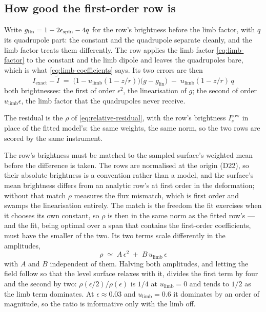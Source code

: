 \subsection{How good the first-order row is}
\label{sec:first-order-residual}

Write $g_\text{lin} = 1 - 2\epsilon_\text{spin} - 4q$ for the row's brightness before the limb
factor, with $q$ its quadrupole part: the constant and the quadrupole separate cleanly, and the
limb factor treats them differently.  The row applies the limb factor
\eqref{eq:limb-factor} to the constant and the limb dipole and leaves the quadrupoles bare,
which is what \eqref{eq:limb-coefficients} says.  Its two errors are then
\begin{equation}
  I_\text{exact} - \tilde I \;=\;
    \bigl(1 - u_\text{limb}(1 - z/r)\bigr)\bigl(g - g_\text{lin}\bigr)
    \;-\; u_\text{limb}(1 - z/r)\,q
  \label{eq:row-error}
\end{equation}
both brightnesses: the first of order $\epsilon^2$, the linearisation of $g$; the second of order
$u_\text{limb}\epsilon$, the limb factor that the quadrupoles never receive.

The residual is the $\rho$ of \eqref{eq:relative-residual}, with the row's brightness
$I^\text{row}_s$ in place of the fitted model's: the same weights, the same norm, so the two rows
are scored by the same instrument.

The row's brightness must be matched to the sampled surface's weighted mean before the
difference is taken.  The rows are normalised at the origin (D22), so their absolute brightness
is a convention rather than a model, and the surface's mean brightness differs from an analytic
row's at first order in the deformation; without that match $\rho$ measures the flux mismatch,
which is first order and swamps the linearisation entirely.  The match is the freedom the fit
exercises when it chooses its own constant, so $\rho$ is then in the same norm as the fitted
row's --- and the fit, being optimal over a span that contains the first-order coefficients,
must have the smaller of the two.  Its two terms scale
differently in the amplitudes,
\begin{equation}
  \rho \;\simeq\; A\,\epsilon^2 \;+\; B\,u_\text{limb}\,\epsilon
  \label{eq:rho-scaling}
\end{equation}
with $A$ and $B$ independent of them.  Halving both amplitudes, and letting the field follow so
that the level surface relaxes with it, divides the first term by four and the second by two:
$\rho(\epsilon/2)/\rho(\epsilon)$ is $1/4$ at $u_\text{limb} = 0$ and tends to $1/2$ as the limb
term dominates.  At $\epsilon \approx 0.03$ and $u_\text{limb} = 0.6$ it dominates by an order of
magnitude, so the ratio is informative only with the limb off.

